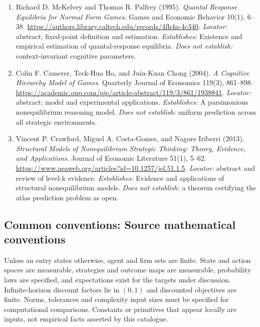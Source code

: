 \documentclass[11pt,a4paper]{article}
\begin{document}
\begin{enumerate}

\item[S1] Richard D. McKelvey and Thomas R. Palfrey (1995). \emph{Quantal Response Equilibria for Normal Form Games}. Games and Economic Behavior 10(1), 6--38. \url{https://authors.library.caltech.edu/records/4fh4n-4c340}. \textit{Locator:} abstract; fixed-point definition and estimation. \textit{Establishes:} Existence and empirical estimation of quantal-response equilibria. \textit{Does not establish:} context-invariant cognitive parameters.

\item[S2] Colin F. Camerer, Teck-Hua Ho, and Juin-Kuan Chong (2004). \emph{A Cognitive Hierarchy Model of Games}. Quarterly Journal of Economics 119(3), 861--898. \url{https://academic.oup.com/qje/article-abstract/119/3/861/1938841}. \textit{Locator:} abstract; model and experimental applications. \textit{Establishes:} A parsimonious nonequilibrium reasoning model. \textit{Does not establish:} uniform prediction across all strategic environments.

\item[S3] Vincent P. Crawford, Miguel A. Costa-Gomes, and Nagore Iriberri (2013). \emph{Structural Models of Nonequilibrium Strategic Thinking: Theory, Evidence, and Applications}. Journal of Economic Literature 51(1), 5--62. \url{https://www.aeaweb.org/articles?id=10.1257/jel.51.1.5}. \textit{Locator:} abstract and review of level-k evidence. \textit{Establishes:} Evidence and applications of structural nonequilibrium models. \textit{Does not establish:} a theorem certifying the atlas prediction problem as open.

\end{enumerate}

\subsection*{Common conventions: Source mathematical conventions}

Unless an entry states otherwise, agent and firm sets are finite. State and action spaces are measurable, strategies and outcome maps are measurable, probability laws are specified, and expectations exist for the targets under discussion. Infinite-horizon discount factors lie in $(0,1)$ and discounted objectives are finite. Norms, tolerances and complexity input sizes must be specified for computational comparisons. Constants or primitives that appear locally are inputs, not empirical facts asserted by this catalogue.
\end{document}
